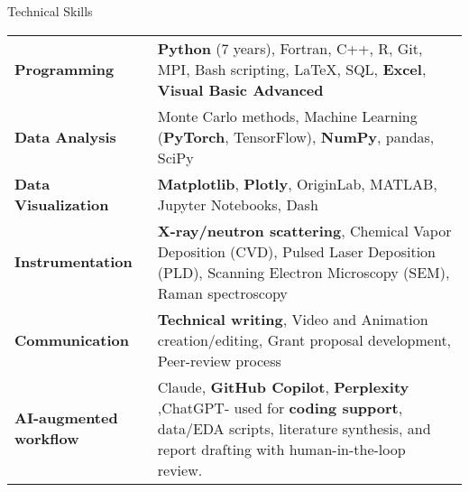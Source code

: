 
\begin{rubric}{Technical Skills}
    \begin{tabular}{@{}p{4.5cm} p{10.5cm}@{}}
        \textbf{Programming} & \textbf{Python} (7 years), Fortran, C++, R, Git, MPI, Bash scripting, LaTeX, SQL, \textbf{Excel},\textbf{ Visual Basic Advanced} \\
        \textbf{Data Analysis} & Monte Carlo methods, Machine Learning (\textbf{PyTorch}, TensorFlow), \textbf{NumPy}, pandas, SciPy \\
        \textbf{Data Visualization} & \textbf{Matplotlib}, \textbf{Plotly}, OriginLab, MATLAB, Jupyter Notebooks, Dash \\
        \textbf{Instrumentation} & \textbf{X-ray/neutron scattering}, Chemical Vapor Deposition (CVD), Pulsed Laser Deposition (PLD), Scanning Electron Microscopy (SEM), Raman spectroscopy \\
        \textbf{Communication} & \textbf{Technical writing}, Video and Animation creation/editing, Grant proposal development, Peer-review process  \\
        \textbf{AI-augmented workflow} &   Claude, \textbf{GitHub Copilot}, \textbf{Perplexity} ,ChatGPT- used for \textbf{coding support}, data/EDA scripts, literature synthesis, and report drafting with human-in-the-loop review.
    \end{tabular}
\end{rubric}